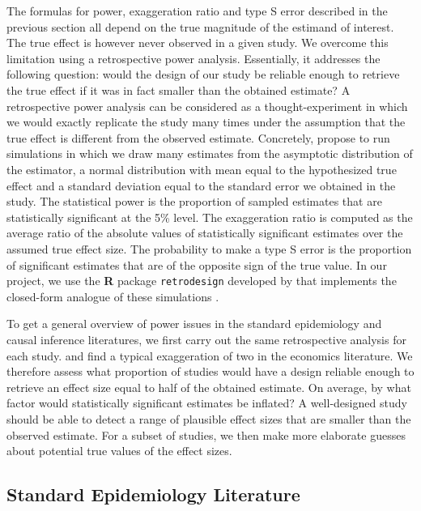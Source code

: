 \documentclass[12pt]{article}
\begin{document}
    The formulas for power, exaggeration ratio and type S error described in the previous section all depend on the true magnitude of the estimand of interest. The true effect is however never observed in a given study.  We overcome this limitation using a retrospective power analysis. Essentially, it addresses the following question: would the design of our study be reliable enough to retrieve the true effect if it was in fact smaller than the obtained estimate? A retrospective power analysis can be considered as a thought-experiment in which we would exactly replicate the study many times under the assumption that the true effect is different from the observed estimate. Concretely, \cite{gelman_beyond_2014} propose to run simulations in which we draw many estimates from the asymptotic distribution of the estimator, a normal distribution with mean equal to the hypothesized true effect and a standard deviation equal to the standard error we obtained in the study. The statistical power is the proportion of sampled estimates that are statistically significant at the 5\% level. The exaggeration ratio is computed as the average ratio of the absolute values of statistically significant estimates over the assumed true effect size. The probability to make a type S error is the proportion of significant estimates that are of the opposite sign of the true value. In our project, we use the \textbf{\textsf{R}} package \texttt{retrodesign} developed by \cite{timm_retrodesign_2019} that implements the closed-form analogue of these simulations \citep{lu_note_2019}.
    
     To get a general overview of power issues in the standard epidemiology and causal inference literatures, we first carry out the same retrospective analysis for each study. \cite{ioannidis_power_2017} and \citep{ferraro_featureis_2020} find a typical exaggeration of two in the economics literature. We therefore assess what proportion of studies would have a design reliable enough to retrieve an effect size equal to half of the obtained estimate. On average, by what factor would statistically significant estimates be inflated? A well-designed study should be able to detect a range of plausible effect sizes that are smaller than the observed estimate. For a subset of studies, we then make more elaborate guesses about potential true values of the effect sizes. 
 
    
    \subsection{Standard Epidemiology Literature}
    
\end{document}
